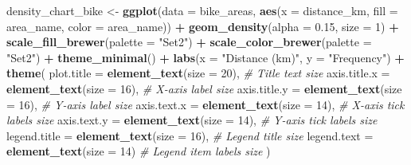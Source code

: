 \documentclass[
]{article}
\newenvironment{Shaded}{\begin{snugshade}}{\end{snugshade}}
\newcommand{\AttributeTok}[1]{\textcolor[rgb]{0.13,0.29,0.53}{#1}}
\newcommand{\CommentTok}[1]{\textcolor[rgb]{0.56,0.35,0.01}{\textit{#1}}}
\newcommand{\DecValTok}[1]{\textcolor[rgb]{0.00,0.00,0.81}{#1}}
\newcommand{\FloatTok}[1]{\textcolor[rgb]{0.00,0.00,0.81}{#1}}
\newcommand{\FunctionTok}[1]{\textcolor[rgb]{0.13,0.29,0.53}{\textbf{#1}}}
\newcommand{\NormalTok}[1]{#1}
\newcommand{\OtherTok}[1]{\textcolor[rgb]{0.56,0.35,0.01}{#1}}
\newcommand{\SpecialCharTok}[1]{\textcolor[rgb]{0.81,0.36,0.00}{\textbf{#1}}}
\newcommand{\StringTok}[1]{\textcolor[rgb]{0.31,0.60,0.02}{#1}}
\begin{document}
\begin{Shaded}
\begin{Highlighting}[]
\NormalTok{density\_chart\_bike }\OtherTok{\textless{}{-}} \FunctionTok{ggplot}\NormalTok{(}\AttributeTok{data =}\NormalTok{ bike\_areas, }\FunctionTok{aes}\NormalTok{(}\AttributeTok{x =}\NormalTok{ distance\_km, }\AttributeTok{fill =}\NormalTok{ area\_name, }\AttributeTok{color =}\NormalTok{ area\_name)) }\SpecialCharTok{+}
  \FunctionTok{geom\_density}\NormalTok{(}\AttributeTok{alpha =} \FloatTok{0.15}\NormalTok{, }\AttributeTok{size =} \DecValTok{1}\NormalTok{) }\SpecialCharTok{+} 
  \FunctionTok{scale\_fill\_brewer}\NormalTok{(}\AttributeTok{palette =} \StringTok{"Set2"}\NormalTok{) }\SpecialCharTok{+} 
  \FunctionTok{scale\_color\_brewer}\NormalTok{(}\AttributeTok{palette =} \StringTok{"Set2"}\NormalTok{) }\SpecialCharTok{+} 
  \FunctionTok{theme\_minimal}\NormalTok{() }\SpecialCharTok{+}
  \FunctionTok{labs}\NormalTok{(}\AttributeTok{x =} \StringTok{"Distance (km)"}\NormalTok{, }\AttributeTok{y =} \StringTok{"Frequency"}\NormalTok{) }\SpecialCharTok{+} 
  \FunctionTok{theme}\NormalTok{(}
  \AttributeTok{plot.title =} \FunctionTok{element\_text}\NormalTok{(}\AttributeTok{size =} \DecValTok{20}\NormalTok{),       }\CommentTok{\# Title text size}
  \AttributeTok{axis.title.x =} \FunctionTok{element\_text}\NormalTok{(}\AttributeTok{size =} \DecValTok{16}\NormalTok{),      }\CommentTok{\# X{-}axis label size}
  \AttributeTok{axis.title.y =} \FunctionTok{element\_text}\NormalTok{(}\AttributeTok{size =} \DecValTok{16}\NormalTok{),      }\CommentTok{\# Y{-}axis label size}
  \AttributeTok{axis.text.x =} \FunctionTok{element\_text}\NormalTok{(}\AttributeTok{size =} \DecValTok{14}\NormalTok{),       }\CommentTok{\# X{-}axis tick labels size}
  \AttributeTok{axis.text.y =} \FunctionTok{element\_text}\NormalTok{(}\AttributeTok{size =} \DecValTok{14}\NormalTok{),       }\CommentTok{\# Y{-}axis tick labels size}
  \AttributeTok{legend.title =} \FunctionTok{element\_text}\NormalTok{(}\AttributeTok{size =} \DecValTok{16}\NormalTok{),      }\CommentTok{\# Legend title size}
  \AttributeTok{legend.text =} \FunctionTok{element\_text}\NormalTok{(}\AttributeTok{size =} \DecValTok{14}\NormalTok{)        }\CommentTok{\# Legend item labels size}
\NormalTok{  )}


\end{Highlighting}
\end{Shaded}
\end{document}
